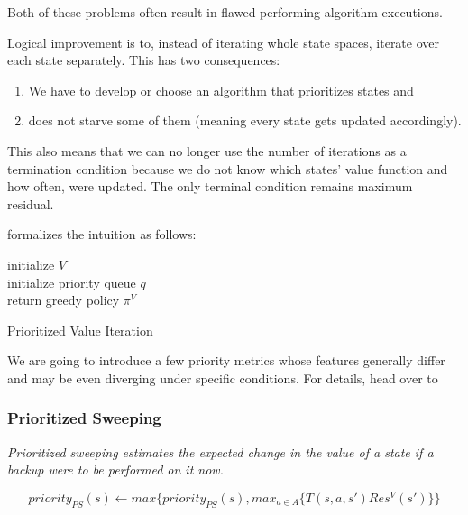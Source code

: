 Both of these problems often result in flawed performing algorithm executions.

Logical improvement is to, instead of iterating whole state spaces, iterate over each state separately. This has two consequences:
\begin{enumerate}
    \item We have to develop or choose an algorithm that prioritizes states and 
    \item does not starve some of them (meaning every state gets updated accordingly).
\end{enumerate}

This also means that we can no longer use the number of iterations as a termination condition because we do not know which states' value function and how often, were updated. The only terminal condition remains maximum residual.

\cite{Kolobov2012} formalizes the intuition as follows:

\LinesNumbered
\begin{algorithm}
\SetAlgoLined
initialize $V$ \\
initialize priority queue $q$ \\
return greedy policy $\pi^{V}$
\caption{Prioritized Value Iteration}
\end{algorithm}

We are going to introduce a few priority metrics whose features generally differ and may be even diverging under specific conditions. For details, head over to \cite{Kolobov2012}

\subsubsection{Prioritized Sweeping} 

\textit{Prioritized sweeping estimates the expected change in the value of a state if a backup were to be performed on it now.}

$$priority_{PS} (s) \xleftarrow{} max \Big\{ priority_{PS} (s), max_{a \in A} \big\{ T(s, a, s') Res^{V}(s')\big\} \Big\} $$


